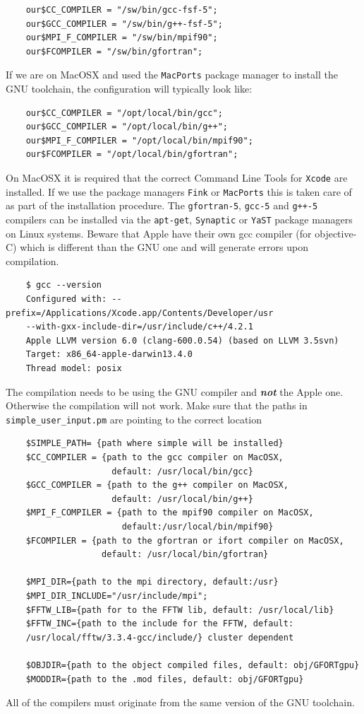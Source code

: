 \documentclass[a4paper,11pt]{article}
\begin{document}
\begin{verbatim}
    our$CC_COMPILER = "/sw/bin/gcc-fsf-5";
    our$GCC_COMPILER = "/sw/bin/g++-fsf-5";
    our$MPI_F_COMPILER = "/sw/bin/mpif90";
    our$FCOMPILER = "/sw/bin/gfortran";
\end{verbatim}

If we are on MacOSX and used the \texttt{MacPorts} package manager to install the GNU toolchain, the configuration will typically look like:

\begin{verbatim}
    our$CC_COMPILER = "/opt/local/bin/gcc";
    our$GCC_COMPILER = "/opt/local/bin/g++";
    our$MPI_F_COMPILER = "/opt/local/bin/mpif90";
    our$FCOMPILER = "/opt/local/bin/gfortran";
\end{verbatim}

On MacOSX it is required that the correct Command Line Tools for \texttt{Xcode} are installed. If we use the package managers \texttt{Fink} or \texttt{MacPorts} this is taken care of as part of the installation procedure. The \texttt{gfortran-5},  \texttt{gcc-5} and \texttt{g++-5} compilers can be installed via the \texttt{apt-get}, \texttt{Synaptic} or \texttt{YaST} package managers on Linux systems. Beware that Apple have their own gcc compiler (for objective-C) which is different than the GNU one and will generate errors upon compilation.

\begin{verbatim}
    $ gcc --version 
    Configured with: --prefix=/Applications/Xcode.app/Contents/Developer/usr
    --with-gxx-include-dir=/usr/include/c++/4.2.1
    Apple LLVM version 6.0 (clang-600.0.54) (based on LLVM 3.5svn)
    Target: x86_64-apple-darwin13.4.0
    Thread model: posix
\end{verbatim}

The compilation needs to be using the GNU compiler and \textbf{\textit{not}} the Apple one. Otherwise the compilation will not work. Make sure that the paths in \texttt{simple\_user\_input.pm} are pointing to the correct location

\begin{verbatim}
    $SIMPLE_PATH= {path where simple will be installed}
    $CC_COMPILER = {path to the gcc compiler on MacOSX,
                     default: /usr/local/bin/gcc}
    $GCC_COMPILER = {path to the g++ compiler on MacOSX,
                     default: /usr/local/bin/g++}
    $MPI_F_COMPILER = {path to the mpif90 compiler on MacOSX, 
                       default:/usr/local/bin/mpif90}
    $FCOMPILER = {path to the gfortran or ifort compiler on MacOSX,
                   default: /usr/local/bin/gfortran}

    $MPI_DIR={path to the mpi directory, default:/usr}
    $MPI_DIR_INCLUDE="/usr/include/mpi";
    $FFTW_LIB={path for to the FFTW lib, default: /usr/local/lib}
    $FFTW_INC={path to the include for the FFTW, default:
    /usr/local/fftw/3.3.4-gcc/include/} cluster dependent

    $OBJDIR={path to the object compiled files, default: obj/GFORTgpu}
    $MODDIR={path to the .mod files, default: obj/GFORTgpu}
\end{verbatim}
All of the compilers must originate from the same version of the GNU toolchain.
\end{document}
